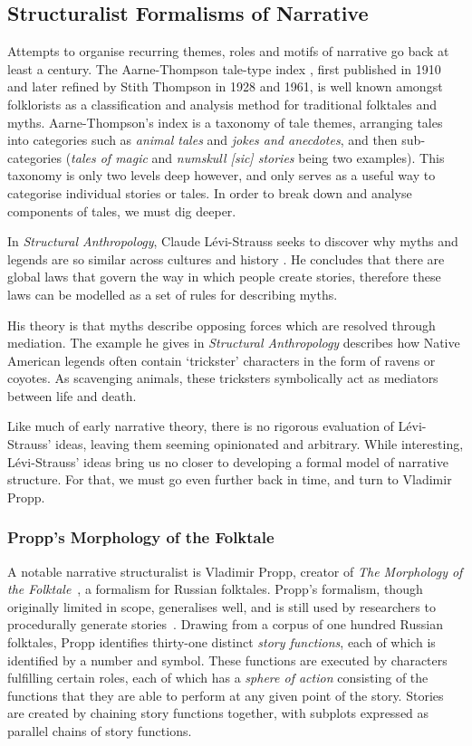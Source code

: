 \documentclass[11pt]{report}
\begin{document}
\subsection{Structuralist Formalisms of Narrative}
\label{sec:formalisms}

Attempts to organise recurring themes, roles and motifs of narrative go back at least a century. The Aarne-Thompson tale-type index \citep{aarne1987types}, first published in 1910 and later refined by Stith Thompson in 1928 and 1961, is well known amongst folklorists as a classification and analysis method for traditional folktales and myths. Aarne-Thompson's index is a taxonomy of tale themes, arranging tales into categories such as \emph{animal tales} and \emph{jokes and anecdotes}, and then sub-categories (\emph{tales of magic} and \emph{numskull [sic] stories} being two examples). This taxonomy is only two levels deep however, and only serves as a useful way to categorise individual stories or tales. In order to break down and analyse components of tales, we must dig deeper.

In \emph{Structural Anthropology}, Claude L\'{e}vi-Strauss seeks to discover why myths and legends are so similar across cultures and history \citep{levi1963structural}. He concludes that there are global laws that govern the way in which people create stories, therefore these laws can be modelled as a set of rules for describing myths.

His theory is that myths describe opposing forces which are resolved through mediation. The example he gives in \emph{Structural Anthropology} describes how Native American legends often contain `trickster' characters in the form of ravens or coyotes. As scavenging animals, these tricksters symbolically act as mediators between life and death.

Like much of early narrative theory, there is no rigorous evaluation of L\'{e}vi-Strauss' ideas, leaving them seeming opinionated and arbitrary. While interesting, L\'{e}vi-Strauss' ideas bring us no closer to developing a formal model of narrative structure. For that, we must go even further back in time, and turn to Vladimir Propp.

\subsubsection{Propp's Morphology of the Folktale}
A notable narrative structuralist is Vladimir Propp, creator of \emph{The Morphology of the Folktale}~\citep{propp1968morphology}, a formalism for Russian folktales. Propp's formalism, though originally limited in scope, generalises well, and is still used by researchers to procedurally generate stories~\citep{grasbon2001morphological,gervas2005story,hartmann2005motif}. Drawing from a corpus of one hundred Russian folktales, Propp identifies thirty-one distinct \emph{story functions}, each of which is identified by a number and symbol. These functions are executed by characters fulfilling certain roles, each of which has a \emph{sphere of action} consisting of the functions that they are able to perform at any given point of the story. Stories are created by chaining story functions together, with subplots expressed as parallel chains of story functions.
\end{document}
